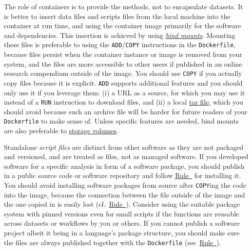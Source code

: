 \documentclass[10pt,letterpaper]{article}
\begin{document}
  \label{rule:mount} 

The role of containers is to provide the methods, not to encapsulate
datasets. It is better to insert data files and scripts files from the
local machine into the container at run time, and using the container
image primarily for the software and dependencies. This insertion is
achieved by using
\href{https://docs.docker.com/storage/bind-mounts/}{\emph{bind mounts}}.
Mounting these files is preferable to using the
\texttt{ADD}/\texttt{COPY} instructions in the \texttt{Dockerfile},
because files persist when the container instance or image is removed
from your system, and the files are more accessible to other users if
published in an online research compendium outside of the image. You
should use \texttt{COPY} if you actually copy files because it is
explicit. \texttt{ADD} supports additional features and you should only
use it if you leverage them: (i) a URL as a source, for which you may
use it instead of a \texttt{RUN} instruction to download files, and (ii)
a local \href{https://en.wikipedia.org/wiki/Tar_(computing)}{tar file},
which you should avoid because such an archive file will be harder for
future readers of your \texttt{Dockerfile} to make sense of. Unless
specific features are needed, bind mounts are also preferable to
\href{https://docs.docker.com/storage/volumes/}{storage volumes}.

Standalone \emph{script files} are distinct from other software as they
are not packaged and versioned, and are treated as files, not as managed
software. If you developed software for a specific analysis in form of a
software package, you should publish in a public source code or software
repository and follow
\hyperref[{rule:pinning}]{Rule~} for installing
it. You should avoid installing software packages from source after
\texttt{COPY}ing the code into the image, because the connection between
the file outside of the image and the one copied in is easily lost
(cf.~\hyperref[{rule:mount}]{Rule~}). Consider
using the suitable package system with pinned versions even for small
scripts if the functions are reusable across datasets or workflows by
you or others. If you cannot publish a software project albeit it being
in a language's package structure, you should make sure the files are
always published together with the \texttt{Dockerfile}
(see~\hyperref[{rule:publish}]{Rule~}).
\end{document}
